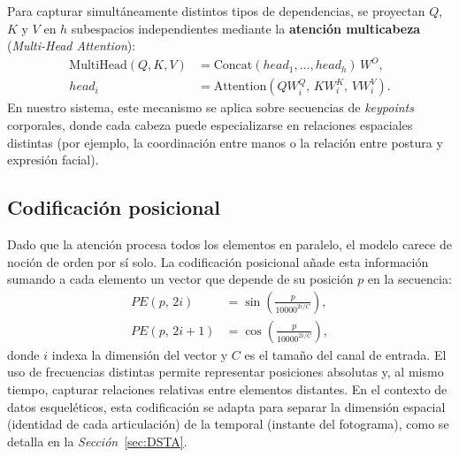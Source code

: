 Para capturar simultáneamente distintos tipos de dependencias, se proyectan $Q$, $K$ y $V$ en $h$ subespacios independientes mediante la \textbf{atención multicabeza} (\textit{Multi-Head Attention}):
\begin{align*}
  \mathrm{MultiHead}(Q,K,V)
    &= \mathrm{Concat}(\mathit{head}_1,\dots,\mathit{head}_h)\,W^O,\\
  \mathit{head}_i
    &= \mathrm{Attention}(QW^Q_i,\,KW^K_i,\,VW^V_i).
\end{align*}
En nuestro sistema, este mecanismo se aplica sobre secuencias de \textit{keypoints} corporales, donde cada cabeza puede especializarse en relaciones espaciales distintas (por ejemplo, la coordinación entre manos o la relación entre postura y expresión facial).



\subsection{Codificación posicional}\label{sub:positional-encoding}

Dado que la atención procesa todos los elementos en paralelo, el modelo carece de noción de orden por sí solo. La codificación posicional añade esta información sumando a cada elemento un vector que depende de su posición $p$ en la secuencia:
\begin{align*}
  PE(p,\,2i)   &= \sin\!\left(\frac{p}{10000^{2i/C}}\right),\\
  PE(p,\,2i+1) &= \cos\!\left(\frac{p}{10000^{2i/C}}\right),
\end{align*}
donde $i$ indexa la dimensión del vector y $C$ es el tamaño del canal de entrada.
El uso de frecuencias distintas permite representar posiciones absolutas y, al mismo tiempo, capturar relaciones relativas entre elementos distantes.
En el contexto de datos esqueléticos, esta codificación se adapta para separar la dimensión espacial (identidad de cada articulación) de la temporal (instante del fotograma), como se detalla en la \textit{Sección}~\ref{sec:DSTA}.

